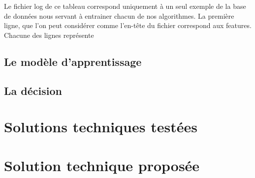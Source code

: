 Le fichier log de ce tableau correspond uniquement à un seul exemple de la base de données nous servant à entrainer chacun de nos algorithmes. 
La première ligne, que l'on peut considérer comme l'en-tête du fichier correspond aux features. Chacune des lignes représente 
\subsection{Le modèle d'apprentissage}
\label{Automatisation du processus d'investigation: Achitecture High Level du système proposé: Le modèle d'apprentissage}

\subsection{La décision}
\label{Automatisation du processus d'investigation: Achitecture High Level du système proposé: La décision}



\section{Solutions techniques testées}
\label{Automatisation du processus d'investigation: Solutions techniques testées}




\section{Solution technique proposée}
\label{Automatisation du processus d'investigation: Solution technique proposée}

